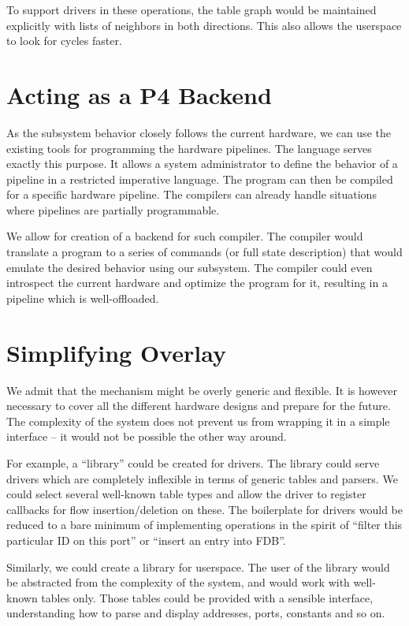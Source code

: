 To support drivers in these operations, the table graph would be maintained
explicitly with lists of neighbors in both directions. This also allows the
userspace to look for cycles faster.

\section{Acting as a P4 Backend}

As the subsystem behavior closely follows the current hardware, we can use the existing
tools for programming the hardware pipelines. The  language \cite{P4} serves exactly
this purpose. It allows a system administrator to define the behavior of
a pipeline in a restricted imperative language. The program can then be compiled
for a specific hardware pipeline. The compilers can already handle situations
where pipelines are partially programmable.

We allow for creation of a backend for such compiler. The compiler would
translate a  program to a series of commands (or full state description) that
would emulate the desired behavior using our subsystem. The compiler could even
introspect the current hardware and optimize the program for it, resulting in
a pipeline which is well-offloaded.

\section{Simplifying Overlay}

We admit that the mechanism might be overly generic and flexible. It is however
necessary to cover all the different hardware designs and prepare for the
future. The complexity of the system does not prevent us from wrapping it in
a simple interface -- it would not be possible the other way around.

For example, a ``library'' could be created for drivers. The library could
serve drivers which are completely inflexible in terms of generic tables and
parsers. We could select several well-known table types and allow the driver to
register callbacks for flow insertion/deletion on these. The boilerplate for
drivers would be reduced to a bare minimum of implementing operations in the spirit
of ``filter this particular  ID on this port'' or ``insert an entry
into FDB''.

Similarly, we could create a library for userspace. The user of the library
would be abstracted from the complexity of the system, and would work with
well-known tables only. Those tables could be provided with a sensible
interface, understanding how to parse and display addresses, ports, constants
and so on.

